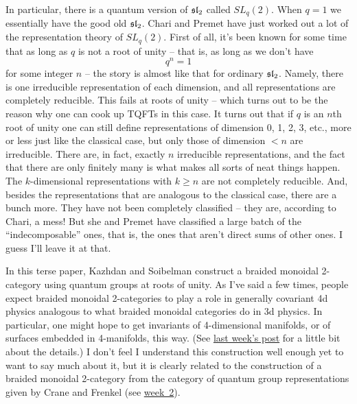 In particular, there is a quantum version of $\mathfrak{sl}_2$ called $SL_q(2)$.  When $q = 1$ we essentially have the good old $\mathfrak{sl}_2$.  Chari and Premet have just worked out a lot of the representation theory of $SL_q(2)$.  First of all, it's been known for some time that as long as $q$ is not a root of unity -- that is, as long as we don't have
\[q^n = 1\]
for some integer $n$ -- the story is almost like that for ordinary $\mathfrak{sl}_2$.  Namely, there is one irreducible representation of each dimension, and all representations are completely reducible.  This fails at roots of unity -- which turns out to be the reason why one can cook up TQFTs in this case.  It turns out that if $q$ is an $n$th root of unity one can still define representations of dimension 0, 1, 2, 3, etc., more or less just like the classical case, but only those of dimension $< n$ are irreducible.  There are, in fact, exactly $n$ irreducible representations, and the fact that there are only finitely many is what makes all sorts of neat things happen.  The $k$-dimensional representations with $k \geq n$ are not completely reducible.  And, besides the representations that are analogous to the classical case, there are a bunch more.  They have not been completely classified -- they are, according to Chari, a mess!  But she and Premet have classified a large batch of the ``indecomposable'' ones, that is, the ones that aren't direct sums of other ones.  I guess I'll leave it at that.


In this terse paper, Kazhdan and Soibelman construct a braided monoidal 2-category using quantum groups at roots of unity.  As I've said a few times, people expect braided monoidal 2-categories to play a role in generally covariant 4d physics analogous to what braided monoidal categories do in 3d physics.  In particular, one might hope to get invariants of 4-dimensional manifolds, or of surfaces embedded in 4-manifolds, this way.  (See {\hyperref[find4.3]{last week's post}} for a little bit about the details.)  I don't feel I understand this construction well enough yet to want to say much about it, but it is clearly related to the construction of a braided monoidal 2-category from the category of quantum group representations given by Crane and Frenkel (see {\hyperref[week2]{week~2}}).


